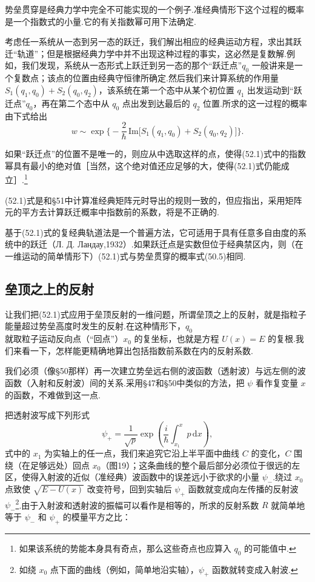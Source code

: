 势垒贯穿是经典力学中完全不可能实现的一个例子.准经典情形下这个过程的概率是一个指数式的小量.它的有关指数幂可用下法确定.

考虑任一系统从一态到另一态的跃迁，我们解出相应的经典运动方程，求出其跃迁“轨道”；但是根据经典力学中并不出现这种过程的事实，这必然是复数解.例如，我们发现，系统从一态形式上跃迁到另一态的那个“跃迁点”$q_0$ 一般讲来是一个复数点；该点的位置由经典守恒律所确定.然后我们来计算系统的作用量 $S_1(q_1,q_0)+S_2(q_0,q_2)$，该系统在第一个态中从某个初位置 $q_1$ 出发运动到“跃迁点”$q_0$，再在第二个态中从 $q_0$ 点出发到达最后的 $q_2$ 位置.所求的这一过程的概率由下式给出
\begin{equation}
  w\sim\exp\bigg\{-\frac{2}{\hbar}\,\mathrm{Im}\big[S_1(q_1,q_0)+S_2(q_0,q_2)\big]\bigg\}.
\end{equation}

如果“跃迁点”的位置不是唯一的，则应从中选取这样的点，使得(52.1)式中的指数幂具有最小的绝对值［当然，这个绝对值还应足够的大，使得(52.1)式仍能成立］.\footnote{如果该系统的势能本身具有奇点，那么这些奇点也应算入 $q_0$ 的可能值中.}

(52.1)式是和§51中计算准经典矩阵元时导出的规则一致的，但应指出，采用矩阵元的平方去计算跃迁概率中指数前的系数，将是不正确的.

基于(52.1)式的复经典轨道法是一个普遍方法，它可适用于具有任意多自由度的系统中的跃迁（Л. Д. Ландау,1932）.如果跃迁点是实数但位于经典禁区内，则（在一维运动的简单情形下）(52.1)式与势垒贯穿的概率式(50.5)相同.

\subsection*{垒顶之上的反射}

让我们把(52.1)式应用于垒顶反射的一维问题，所谓垒顶之上的反射，就是指粒子能量超过势垒高度时发生的反射.在这种情形下，$q_0$ 就取粒子运动反向点（“回点”）$x_0$ 的复坐标，也就是方程 $U(x)=E$ 的复根.我们来看一下，怎样能更精确地算出包括指数前系数在内的反射系数.

我们必须（像§50那样）再一次建立势垒远右侧的波函数（透射波）与远左侧的波函数（入射和反射波）间的关系.采用§47和§50中类似的方法，把 $\psi$ 看作复变量 $x$ 的函数，不难做到这一点.

把透射波写成下列形式
\begin{equation*}
  \psi_+=\frac{1}{\sqrt{p}}\exp\left(\frac{i}{\hbar}\int_{x_1}^x p\,\mathrm{d}x\right),
\end{equation*}
式中的 $x_1$ 为实轴上的任一点，我们来追究它沿上半平面中曲线 $C$ 的变化，$C$ 围绕（在足够远处）回点 $x_0$（图19）；这条曲线的整个最后部分必须位于很远的左区，使得入射波的近似（准经典）波函数中的误差远小于欲求的小量 $\psi_-$.绕过 $x_0$ 点致使 $\sqrt{E-U(x)}$ 改变符号，回到实轴后 $\psi_+$ 函数就变成向左传播的反射波 $\psi_-$\footnote{如绕 $x_0$ 点下面的曲线（例如，简单地沿实轴），$\psi_+$ 函数就转变成入射波.}.由于入射波和透射波的振幅可以看作是相等的，所求的反射系数 $R$ 就简单地等于 $\psi_-$ 和 $\psi_+$ 的模量平方之比：

